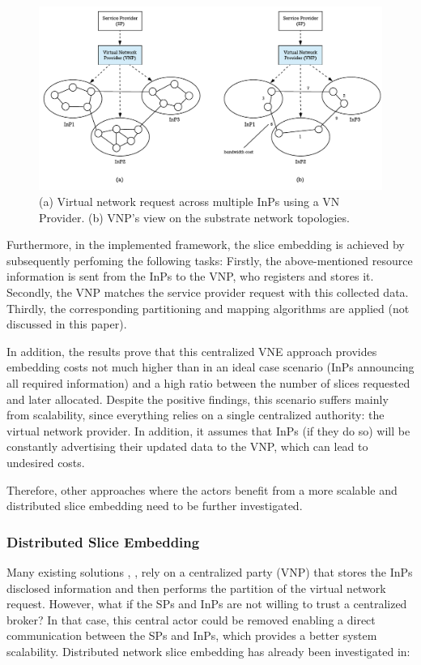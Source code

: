 \begin{figure}
	\centering
	\includegraphics[width=0.9\linewidth]{gfx/multiprov}    
  \caption{(a) Virtual network request across multiple InPs using a VN Provider. (b) VNP's view on the substrate network topologies. \citep{dietrich2015multi}}
  \label{fig:multiprov}
\end{figure}

Furthermore, in the \citep{dietrich2015multi} implemented framework, the slice embedding is achieved by subsequently perfoming the following tasks: Firstly, the above-mentioned resource information is sent from the InPs to the VNP, who registers and stores it. Secondly, the VNP matches the service provider request with this collected data. Thirdly, the corresponding partitioning and mapping algorithms are applied (not discussed in this paper). 

In addition, the results prove that this centralized VNE approach provides embedding costs not much higher than in an ideal case scenario (InPs announcing all required information) and a high ratio between the number of slices requested and later allocated. Despite the positive findings, this scenario suffers mainly from scalability, since everything relies on a single centralized authority: the virtual network provider. In addition, it assumes that InPs (if they do so) will be constantly advertising their updated data to the VNP, which can lead to undesired costs.

Therefore, other approaches where the actors benefit from a more scalable and distributed slice embedding need to be further investigated.

\subsubsection{Distributed Slice Embedding}

Many existing solutions \citep{houidi2011virtual}, \citep{dietrich2015multi}, \citep{dietrich2017multi} rely on a centralized party (VNP) that stores the InPs disclosed information and then performs the partition of the virtual network request. However, what if the SPs and InPs are not willing to trust a centralized broker? In that case, this central actor could be removed enabling a direct communication between the SPs and InPs, which provides a better system scalability. Distributed network slice embedding has already been investigated in:

